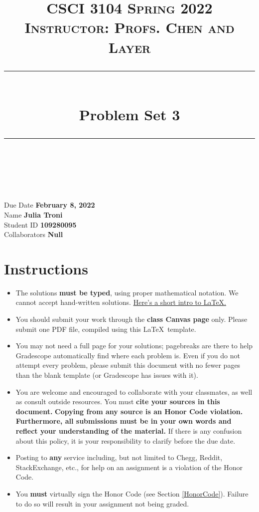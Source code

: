\documentclass[11pt]{article}
\title{
\normalfont \normalsize 
\textsc{CSCI 3104 Spring 2022 \\ 
Instructor: Profs. Chen and Layer} \\
[10pt] 
\rule{\linewidth}{0.5pt} \\[6pt] 
\huge Problem Set 3 \\
\rule{\linewidth}{2pt}  \\[10pt]
}
\date{}
\theoremstyle{definition}
\theoremstyle{definition}
\theoremstyle{definition}
\begin{document}

\maketitle


\noindent
Due Date \dotfill \textbf{February 8, 2022} \\
Name \dotfill \textbf{Julia Troni} \\
Student ID \dotfill \textbf{109280095} \\
Collaborators \dotfill \textbf{Null}

\tableofcontents

\section{Instructions}
 \begin{itemize}
	\item The solutions \textbf{must be typed}, using proper mathematical notation. We cannot accept hand-written solutions. \href{http://ece.uprm.edu/~caceros/latex/introduction.pdf}{Here's a short intro to \LaTeX.}
	\item You should submit your work through the \textbf{class Canvas page} only. Please submit one PDF file, compiled using this \LaTeX \ template.
	\item You may not need a full page for your solutions; pagebreaks are there to help Gradescope automatically find where each problem is. Even if you do not attempt every problem, please submit this document with no fewer pages than the blank template (or Gradescope has issues with it).

	\item You are welcome and encouraged to collaborate with your classmates, as well as consult outside resources. You must \textbf{cite your sources in this document.} \textbf{Copying from any source is an Honor Code violation. Furthermore, all submissions must be in your own words and reflect your understanding of the material.} If there is any confusion about this policy, it is your responsibility to clarify before the due date. 

	\item Posting to \textbf{any} service including, but not limited to Chegg, Reddit, StackExchange, etc., for help on an assignment is a violation of the Honor Code.

	\item You \textbf{must} virtually sign the Honor Code (see Section \ref{HonorCode}). Failure to do so will result in your assignment not being graded.
\end{itemize}
\end{document}
